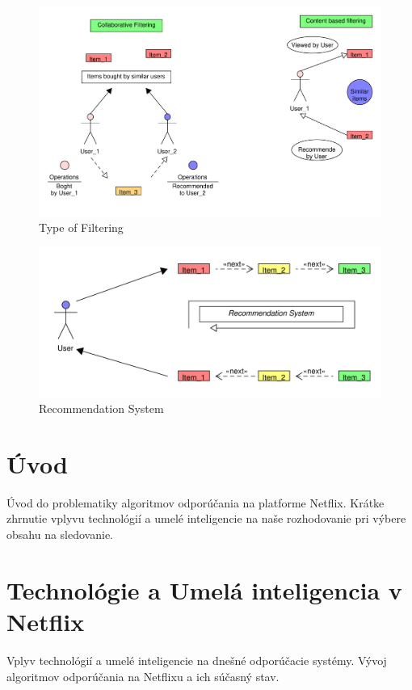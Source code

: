 \documentclass[10pt,twoside,slovak,a4paper]{article}
\begin{document}
\begin{figure}[h!]
  \centering
  \includegraphics[width=1\textwidth]{Images/Filtering_pdf.pdf} %
  \caption{Type of Filtering}
\end{figure}


\begin{figure}[h!]
  \centering
  \includegraphics[width=1\textwidth]{Images/RecommendationSystem_pdf.pdf} %
  \caption{Recommendation System}
\end{figure}

\section{Úvod}
Úvod do problematiky algoritmov odporúčania na platforme Netflix.
Krátke zhrnutie vplyvu technológií a umelé inteligencie na naše rozhodovanie pri výbere obsahu na sledovanie.

\section{Technológie a Umelá inteligencia v Netflix}
Vplyv technológií a umelé inteligencie na dnešné odporúčacie systémy.
Vývoj algoritmov odporúčania na Netflixu a ich súčasný stav.
\end{document}

